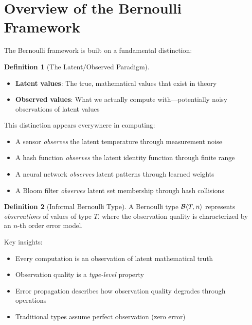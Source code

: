 \documentclass[11pt,twoside,openright]{book}
\theoremstyle{definition}
\newtheorem{definition}{Definition}[chapter]
\theoremstyle{plain}
\theoremstyle{remark}
\begin{document}
\section{Overview of the Bernoulli Framework}
\label{sec:bernoulli-overview}

The Bernoulli framework is built on a fundamental distinction:

\begin{definition}[The Latent/Observed Paradigm]
\begin{itemize}
    \item \textbf{Latent values}: The true, mathematical values that exist in theory
    \item \textbf{Observed values}: What we actually compute with—potentially noisy observations of latent values
\end{itemize}
\end{definition}

This distinction appears everywhere in computing:
\begin{itemize}
    \item A sensor \emph{observes} the latent temperature through measurement noise
    \item A hash function \emph{observes} the latent identity function through finite range
    \item A neural network \emph{observes} latent patterns through learned weights
    \item A Bloom filter \emph{observes} latent set membership through hash collisions
\end{itemize}

\begin{definition}[Informal Bernoulli Type]
A Bernoulli type $\mathcal{B}\langle T, n \rangle$ represents \emph{observations} of values of type $T$, where the observation quality is characterized by an $n$-th order error model.
\end{definition}

Key insights:
\begin{itemize}
    \item Every computation is an observation of latent mathematical truth
    \item Observation quality is a \emph{type-level} property
    \item Error propagation describes how observation quality degrades through operations
    \item Traditional types assume perfect observation (zero error)
\end{itemize}
\end{document}
